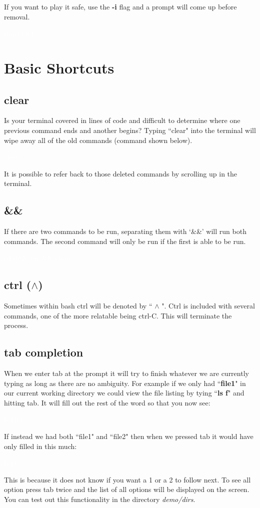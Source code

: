 \documentclass[oneside]{book}
\newcommand{\commandline}[1]{\begin{center} \colorbox{Dark}{\textcolor{white}{#1}} \end{center}}
\begin{document}
If you want to play it safe, use the \textbf{-i} flag and a prompt will come up before removal.\ 
\commandline{rm -i file1}

\section{Basic Shortcuts}

\subsection{clear}
Is your terminal covered in lines of code and difficult to determine where one previous command ends and another begins? Typing ``clear" into the terminal will wipe away all of the old commands (command shown below).
\commandline{clear}
It is possible to refer back to those deleted commands by scrolling up in the terminal.

\subsection{\&\&}
If there are two commands to be run, separating them with `\&\&' will run both commands. The second command will only be run if the first is able to be run.
\commandline{cd dirName \&\& clear}

\subsection{ctrl ($\wedge$)}
Sometimes within bash ctrl will be denoted by `` $\wedge$ ". Ctrl is included with several commands, one of the more relatable being ctrl-C. This will terminate the process. 

\subsection{tab completion}
When we enter tab at the prompt it will try to finish whatever we are currently typing as long as there are no ambiguity. For example if we only had ``\textbf{file1}" in our current working directory we could view the file listing by tying ``\textbf{ls f}" and hitting tab. It will fill out the rest of the word so that you now see:
\commandline{ls file1}
If instead we had both ``file1" and ``file2" then when we pressed tab it would have only filled in this much:
\commandline{ls file}
This is because it does not know if you want a 1 or a 2 to follow next. To see all option press tab twice and the list of all options will be displayed on the screen. You can test out this functionality in the directory \textit{demo/dirs}.\\
\end{document}
